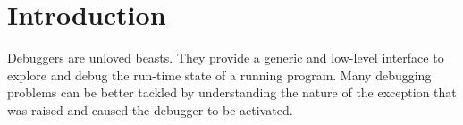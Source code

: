 \documentclass[sigplan,screen]{acmart} %
\newcommand\on[1]{\nbc{ON}{#1}{olive}} %
\begin{document}


\maketitle

\section{Introduction}\label{sec:intro}





Debuggers are unloved beasts.
They provide a generic and low-level interface to explore and debug the run-time state of a running program.
Many debugging problems can be better tackled by understanding the nature of the exception that was raised and caused the debugger to be activated.
\end{document}
